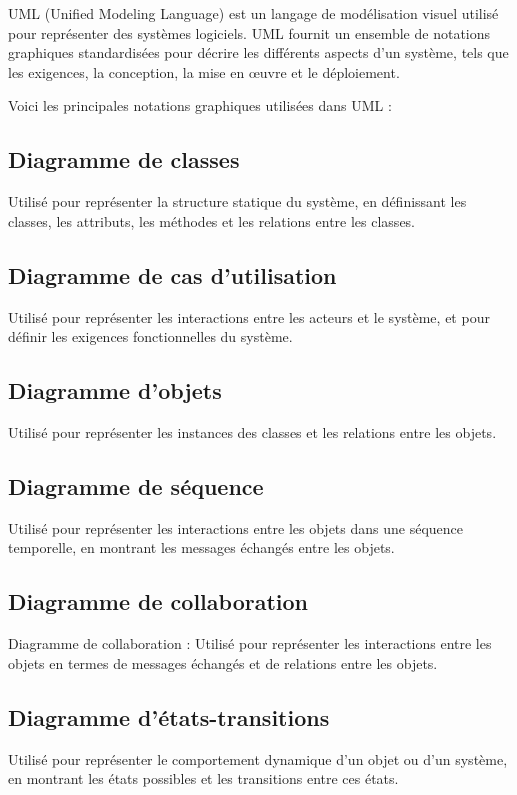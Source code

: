 UML (Unified Modeling Language) est un langage de modélisation visuel utilisé pour représenter des systèmes logiciels. UML fournit un ensemble de notations graphiques standardisées pour décrire les différents aspects d'un système, tels que les exigences, la conception, la mise en œuvre et le déploiement.

Voici les principales notations graphiques utilisées dans UML :
\subsection{Diagramme de classes}\label{subsec:diagrammes-de-classe}
 Utilisé pour représenter la structure statique du système, en définissant les classes, les attributs, les méthodes et les relations entre les classes.
\subsection{Diagramme de cas d'utilisation}\label{subsec:diagrammes-de-cas-utilisation}
Utilisé pour représenter les interactions entre les acteurs et le système, et pour définir les exigences fonctionnelles du système.
\subsection{Diagramme d'objets}\label{subsec:diagrammes-d-objets}
Utilisé pour représenter les instances des classes et les relations entre les objets.
\subsection{Diagramme de séquence}\label{subsec:diagrammes-de-sequence}
Utilisé pour représenter les interactions entre les objets dans une séquence temporelle, en montrant les messages échangés entre les objets.
\subsection{Diagramme de collaboration}\label{subsec:diagrammes-de-collaboration}
Diagramme de collaboration : Utilisé pour représenter les interactions entre les objets en termes de messages échangés et de relations entre les objets.
\subsection{Diagramme d'états-transitions}\label{subsec:diagrammes-d-etat-transition}
Utilisé pour représenter le comportement dynamique d'un objet ou d'un système, en montrant les états possibles et les transitions entre ces états.
